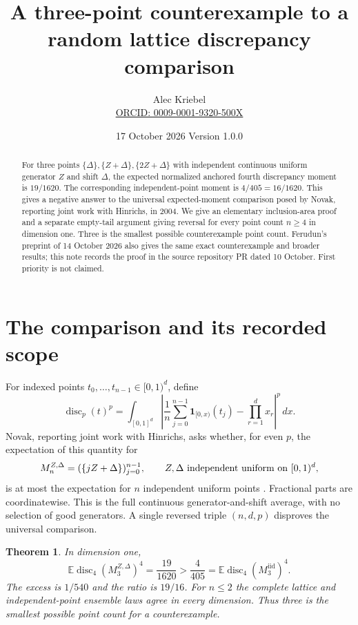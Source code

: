 \documentclass[11pt]{article}
\title{A three-point counterexample to a random lattice discrepancy comparison}
\author{Alec Kriebel\\
\small\href{https://orcid.org/0009-0001-9320-500X}{ORCID: 0009-0001-9320-500X}}
\date{17 October 2026 \quad Version 1.0.0}
\newtheorem{theorem}{Theorem}
\newcommand{\E}{\mathbb E}
\newcommand{\disc}{\operatorname{disc}}
\newcommand{\iid}{\mathrm{iid}}
\begin{document}
\maketitle
\begin{abstract}
For three points $\{\Delta\},\{Z+\Delta\},\{2Z+\Delta\}$ with independent
continuous uniform generator $Z$ and shift $\Delta$, the expected normalized
anchored fourth discrepancy moment is $19/1620$. The corresponding
independent-point moment is $4/405=16/1620$. This gives a negative answer
to the universal expected-moment comparison posed by Novak, reporting
joint work with Hinrichs, in 2004. We give an elementary inclusion-area
proof and a separate empty-tail argument giving reversal for every
point count $n\ge4$ in dimension one. Three is the smallest possible
counterexample point count. Ferudun's preprint of 14 October 2026 also
gives the same exact counterexample and broader results; this note
records the proof in the source repository PR dated 10 October.
First priority is not claimed.
\end{abstract}

\section{The comparison and its recorded scope}
For indexed points $t_0,\ldots,t_{n-1}\in[0,1)^d$, define
\[
 \disc_p(t)^p
 =\int_{[0,1]^d}\left|
       \frac1n\sum_{j=0}^{n-1}\mathbf1_{[0,x)}(t_j)
                    -\prod_{r=1}^d x_r\right|^p\,dx .
\]
Novak, reporting joint work with Hinrichs, asks whether, for even $p$,
the expectation of this quantity for
\[
 M_n^{Z,\Delta}=(\{jZ+\Delta\})_{j=0}^{n-1},
 \qquad Z,\Delta\ \hbox{independent uniform on }[0,1)^d,
\]
is at most the expectation for $n$ independent uniform points
\cite[p.~698]{Novak}. Fractional parts are coordinatewise. This is the
full continuous generator-and-shift average, with no selection of good
generators. A single reversed triple $(n,d,p)$ disproves the universal
comparison.

\begin{theorem}\label{thm:main}
In dimension one,
\[
 \E\disc_4(M_3^{Z,\Delta})^4
 =\frac{19}{1620}
 >\frac{4}{405}
 =\E\disc_4(M_3^\iid)^4 .
\]
The excess is $1/540$ and the ratio is $19/16$.
For $n\le2$ the complete lattice and independent-point ensemble laws agree
in every dimension. Thus three is the smallest possible point count
for a counterexample.
\end{theorem}
\end{document}
